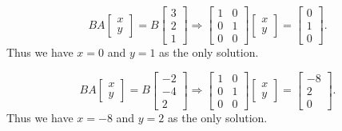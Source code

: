 \begin{example}
\begin{solution}
        \[BA\begin{bmatrix}
            x\\y
        \end{bmatrix} = B\begin{bmatrix}
            3\\2 \\1
        \end{bmatrix} \Rightarrow \begin{bmatrix}
            1 & 0 \\
            0 & 1 \\
            0 & 0
        \end{bmatrix}\begin{bmatrix}x \\y \end{bmatrix} = \begin{bmatrix}
            0 \\ 1 \\ 0
        \end{bmatrix}.\] Thus we have \(x=0\) and \(y=1\) as the only solution.

        \[BA\begin{bmatrix}
            x\\y
        \end{bmatrix} = B\begin{bmatrix}
            -2\\-4 \\2
        \end{bmatrix} \Rightarrow \begin{bmatrix}
            1 & 0 \\
            0 & 1 \\
            0 & 0
        \end{bmatrix}\begin{bmatrix}x \\y \end{bmatrix} = \begin{bmatrix}
            -8 \\ 2 \\ 0
        \end{bmatrix}.\] Thus we have \(x=-8\) and \(y=2\) as the only solution.
    \end{solution}
\end{example}